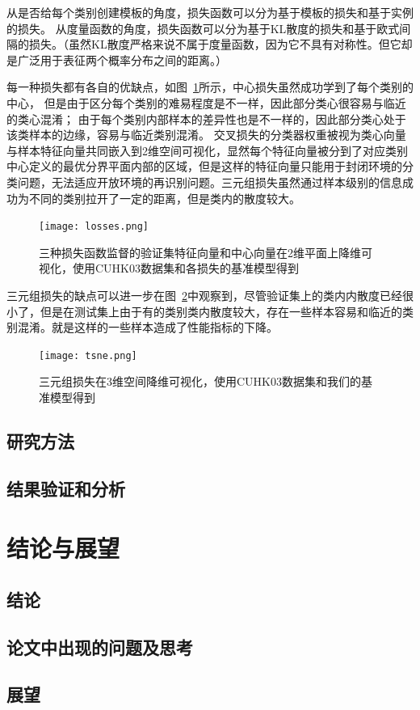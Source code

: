 从是否给每个类别创建模板的角度，损失函数可以分为基于模板的损失和基于实例的损失。
从度量函数的角度，损失函数可以分为基于KL散度的损失和基于欧式间隔的损失。（虽然KL散度严格来说不属于度量函数，因为它不具有对称性。但它却是广泛用于表征两个概率分布之间的距离。）



每一种损失都有各自的优缺点，如图~\ref{fig:losses}所示，中心损失虽然成功学到了每个类别的中心，
但是由于区分每个类别的难易程度是不一样，因此部分类心很容易与临近的类心混淆；
由于每个类别内部样本的差异性也是不一样的，因此部分类心处于该类样本的边缘，容易与临近类别混淆。
交叉损失的分类器权重被视为类心向量与样本特征向量共同嵌入到2维空间可视化，显然每个特征向量被分到了对应类别中心定义的最优分界平面内部的区域，但是这样的特征向量只能用于封闭环境的分类问题，无法适应开放环境的再识别问题。三元组损失虽然通过样本级别的信息成功为不同的类别拉开了一定的距离，但是类内的散度较大。

\begin{figure}
	\centering
	\texttt{[image: losses.png]}
	\caption{三种损失函数监督的验证集特征向量和中心向量在2维平面上降维可视化，使用CUHK03数据集和各损失的基准模型得到}
	\label{fig:losses}
\end{figure}

三元组损失的缺点可以进一步在图~\ref{fig:tsne}中观察到，尽管验证集上的类内内散度已经很小了，但是在测试集上由于有的类别类内散度较大，存在一些样本容易和临近的类别混淆。就是这样的一些样本造成了性能指标的下降。

\begin{figure}
	\centering
	\texttt{[image: tsne.png]}
	\caption{三元组损失在3维空间降维可视化，使用CUHK03数据集和我们的基准模型得到}
	\label{fig:tsne}
\end{figure}

\section{研究方法}

\section{结果验证和分析}

\chapter{结论与展望}

\section{结论}

\section{论文中出现的问题及思考}

\section{展望}

% 
\printbibliography[heading=chapbib]
